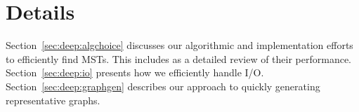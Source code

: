 \section{Details}
\label{sec:deep}
Section~\ref{sec:deep:algchoice} discusses our algorithmic and implementation
efforts to efficiently find MSTs.  This includes as a detailed review of their
performance.  Section~\ref{sec:deep:io} presents how we efficiently handle I/O.
Section~\ref{sec:deep:graphgen} describes our approach to quickly generating
representative graphs.




%
